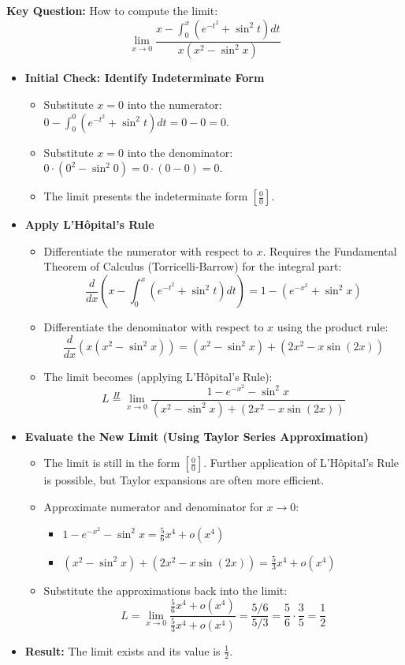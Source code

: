 \begin{cascade}
	\textbf{Key Question:} How to compute the limit: $$\lim_{x \to 0} \frac{x - \int_0^x (e^{-t^2} + \sin^2 t) dt}{x(x^2 - \sin^2 x)}$$
	\begin{itemize}
		\item \textbf{Initial Check: Identify Indeterminate Form}
		      \begin{itemize}
			      \item Substitute $x=0$ into the numerator: $0 - \int_0^0 (e^{-t^2} + \sin^2 t) dt = 0 - 0 = 0$.
			      \item Substitute $x=0$ into the denominator: $0 \cdot (0^2 - \sin^2 0) = 0 \cdot (0 - 0) = 0$.
			      \item The limit presents the indeterminate form $\left[\frac{0}{0}\right]$.
		      \end{itemize}
		\item \textbf{Apply L'Hôpital's Rule}
		      \begin{itemize}
			      \item Differentiate the numerator with respect to $x$. Requires the Fundamental Theorem of Calculus (Torricelli-Barrow) for the integral part:
			            \[ \frac{d}{dx} \left( x - \int_0^x (e^{-t^2} + \sin^2 t) dt \right) = 1 - (e^{-x^2} + \sin^2 x) \]
			      \item Differentiate the denominator with respect to $x$ using the product rule:
			            \[ \frac{d}{dx} (x(x^2 - \sin^2 x)) = (x^2 - \sin^2 x) + (2x^2 - x\sin(2x)) \]
			      \item The limit becomes (applying L'Hôpital's Rule):
			            \[ L \stackrel{H}{=} \lim_{x \to 0} \frac{1 - e^{-x^2} - \sin^2 x}{(x^2 - \sin^2 x) + (2x^2 - x\sin(2x))} \]
		      \end{itemize}
		\item \textbf{Evaluate the New Limit (Using Taylor Series Approximation)}
		      \begin{itemize}
			      \item The limit is still in the form $\left[\frac{0}{0}\right]$. Further application of L'Hôpital's Rule is possible, but Taylor expansions are often more efficient.
			      \item Approximate numerator and denominator for $x \to 0$:
			            \begin{itemize}
				            \item $1 - e^{-x^2} - \sin^2 x = \frac{5}{6}x^4 + o(x^4)$
				            \item $(x^2 - \sin^2 x) + (2x^2 - x\sin(2x)) = \frac{5}{3}x^4 + o(x^4)$
			            \end{itemize}
			      \item Substitute the approximations back into the limit:
			            \[ L = \lim_{x \to 0} \frac{\frac{5}{6}x^4 + o(x^4)}{\frac{5}{3}x^4 + o(x^4)} = \frac{5/6}{5/3} = \frac{5}{6} \cdot \frac{3}{5} = \frac{1}{2} \]
		      \end{itemize}
		\item \textbf{Result:} The limit exists and its value is $\frac{1}{2}$.
	\end{itemize}
\end{cascade}

